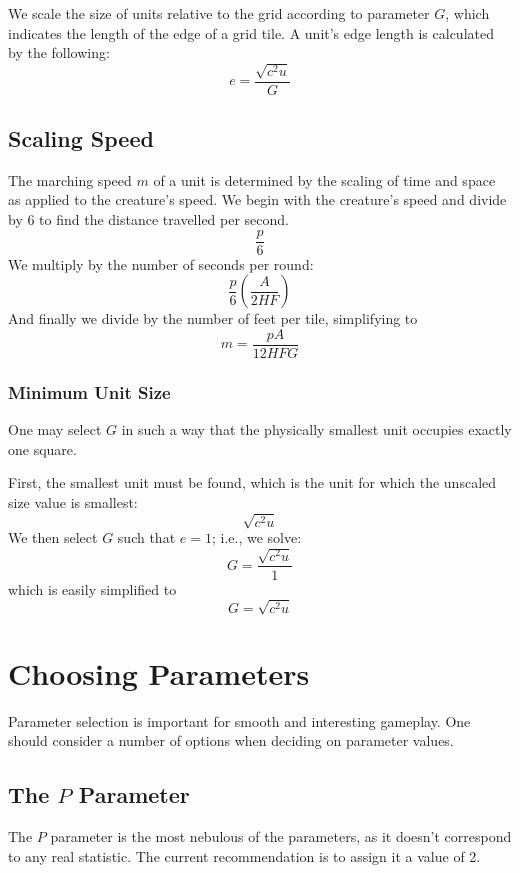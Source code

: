 \documentclass[twocolumn]{article}
\begin{document}
We scale the size of units relative to the grid
according to parameter $G$,
which indicates the length of the edge of a grid tile.
A unit's edge length is calculated by the following:
\[
    e = \frac
        {\sqrt{c^2 u}}
        {G}
\]

\subsection{Scaling Speed}
The marching speed $m$ of a unit is determined
by the scaling of time and space
as applied to the creature's speed.
We begin with the creature's speed and divide by 6
to find the distance travelled per second.
\[
    \frac
        {p}
        {6}
\]
We multiply by the number of seconds per round:
\[
    \frac
        {p}
        {6}
    \left(
        \frac
            {A}
            {2 H F}
    \right)
\]
And finally we divide by the number of feet per tile,
simplifying to
\[
    m = \frac
        {p A}
        {12 H F G}
\]

\subsubsection{Minimum Unit Size}

One may select $G$ in such a way that the physically smallest unit
occupies exactly one square.

First, the smallest unit must be found,
which is the unit for which the unscaled size value is smallest:
\[
    \sqrt{c^2 u}
\]
We then select $G$ such that $e = 1$;
i.e., we solve:
\[
    G = \frac
            {\sqrt{c^2 u}}
            {1}
\]
which is easily simplified to
\[
    G = \sqrt{c^2 u}
\]


\section{Choosing Parameters}\label{sec:params}

Parameter selection is important for smooth and interesting gameplay.
One should consider a number of options when deciding on parameter values.

\subsection{The $P$ Parameter}

The $P$ parameter is the most nebulous of the parameters,
as it doesn't correspond to any real statistic.
The current recommendation is to assign it a value of 2.
\end{document}
